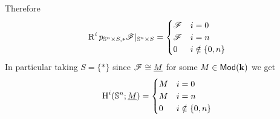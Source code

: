 \documentclass[../../main]{subfiles}
\begin{document}
\begin{example}[\(\mathbb{S}^{n}\)]
  Therefore
  \begin{equation*}
    \operatorname{R}^{i}p_{\mathbb{S}^{n} \times S, \ast}\mathscr{F}|_{\mathbb{S}^{n} \times S} = \begin{cases}
      \mathscr{F} & i = 0 \\
      \mathscr{F} & i = n \\
      0 & i \notin \{0, n\}
    \end{cases}
  \end{equation*}
  In particular taking \(S = \{\ast\}\) since \(\mathscr{F} \cong \underline{M}\) for some \(M \in \mathsf{Mod}(\mathbf{k})\) we get
  \begin{equation*}
    \operatorname{H}^{i}(\mathbb{S}^{n}; \underline{M}) = \begin{cases}
      M & i = 0 \\
      M & i = n \\
      0 & i \notin \{0, n\}
    \end{cases}
  \end{equation*}
\end{example}
\end{document}
